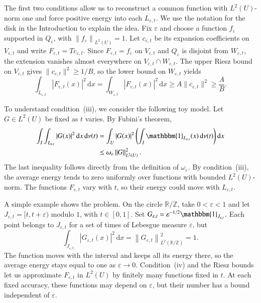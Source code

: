 \documentclass[10pt,a4paper]{amsart}
\def\R{\mathbb{R}}
\def\Z{\mathbb{Z}}
\def\d{\mathrm{d}}
\newcommand\norm[1]{\|#1\|}
\newcommand\1{\mathbbm{1}}
\newcommand\Norm[2]{\left\|#1\right\|_{#2}}
\newcommand{\eps}{\varepsilon}
\def\d{\mathrm{d}}
\begin{document}
The first two conditions allow us to reconstruct a common function with
$L^2(U)$-norm one and force positive energy into each $L_{\eps,t}$.
We use the notation for the disk in the Introduction to explain the idea.
Fix $\eps$ and choose a function $f_\eps$ supported in $Q_\eps$,
with $\Norm{f_\eps}{L^2(U)}=1$. Let $c_{\eps,t}$ be its expansion coefficients
on $V_{\eps,t}$ and write $F_{\eps,t}=Tc_{\eps,t}$.
Since $F_{\eps,t}=f_\eps$ on $V_{\eps,t}$ and $Q_\eps$ is disjoint from
$W_{\eps,t}$, the extension vanishes almost everywhere on
$V_{\eps,t}\cap W_{\eps,t}$.
The upper Riesz bound on $V_{\eps,t}$ gives $\norm{c_{\eps,t}}^2\ge1/B$,
so the lower bound on $W_{\eps,t}$ yields
\begin{equation*}
    \int_{L_{\eps,t}}|F_{\eps,t}(x)|^2\,\d x
    =\int_{W_{\eps,t}}|F_{\eps,t}(x)|^2\,\d x
    \ge A\norm{c_{\eps,t}}^2\ge\frac AB.
\end{equation*}

To understand condition~(iii), we consider the following toy model.
Let $G\in L^2(U)$ be fixed as $t$ varies. By Fubini's theorem,
\begin{equation*}
    \begin{aligned}
        \int_I\int_{L_{\eps,t}}|G(x)|^2\,\d x\,\d\nu(t)
        &=\int_U|G(x)|^2
          \left(\int_I\1_{L_{\eps,t}}(x)\,\d\nu(t)\right)\d x\\
        &\le\omega_\eps\Norm{G}{L^2(U)}^2.
    \end{aligned}
\end{equation*}
The last inequality follows directly from the definition of $\omega_\eps$.
By condition~(iii), the average energy tends to zero uniformly over functions
with bounded $L^2(U)$-norm. The functions $F_{\eps,t}$ vary with $t$, so their energy could
move with $L_{\eps,t}$.

A simple example shows the problem. On the circle $\R/\Z$, take $0<\eps<1$
and let $J_{\eps,t}=[t,t+\eps)$ modulo $1$, with $t\in[0,1]$.
Set $G_{\eps,t}=\eps^{-1/2}\1_{J_{\eps,t}}$.
Each point belongs to $J_{\eps,t}$ for a set of times of Lebesgue measure $\eps$, but
\begin{equation*}
    \int_{J_{\eps,t}}|G_{\eps,t}(x)|^2\,\d x
    =\Norm{G_{\eps,t}}{L^2(\R/\Z)}^2=1.
\end{equation*}
The function moves with the interval and keeps all its energy there, so the
average energy stays equal to one as $\eps\to0$.
Condition~(iv) and the Riesz bounds let us approximate $F_{\eps,t}$ in $L^2(U)$
by finitely many functions fixed in $t$. At each fixed accuracy, these functions
may depend on $\eps$, but their number has a bound independent of $\eps$.
\end{document}
